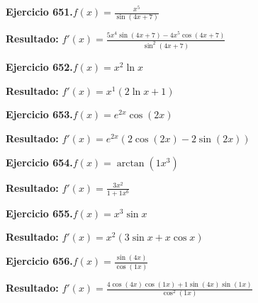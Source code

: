 \documentclass[10pt,a4paper]{article}
\begin{document}
\begin{ejbox}
\textbf{Ejercicio 651.}\quad $f(x) = \frac{x^{5}}{\sin(4x +7)}$
\end{ejbox}

\begin{solbox}
\textbf{Resultado:} \(\displaystyle f'(x) = \frac{5x^{4}\sin(4x +7) - 4x^{5}\cos(4x +7)}{\sin^2(4x +7)}\)
\end{solbox}

\newpage
\begin{ejbox}
\textbf{Ejercicio 652.}\quad $f(x) = x^{2} \ln x$
\end{ejbox}

\begin{solbox}
\textbf{Resultado:} \(\displaystyle f'(x) = x^{1}(2\ln x + 1)\)
\end{solbox}

\begin{ejbox}
\textbf{Ejercicio 653.}\quad $f(x) = e^{2x} \cos(2x)$
\end{ejbox}

\begin{solbox}
\textbf{Resultado:} \(\displaystyle f'(x) = e^{2x}(2\cos(2x) - 2\sin(2x))\)
\end{solbox}

\begin{ejbox}
\textbf{Ejercicio 654.}\quad $f(x) = \arctan(1x^{3})$
\end{ejbox}

\begin{solbox}
\textbf{Resultado:} \(\displaystyle f'(x) = \frac{3x^{2}}{1+1x^{6}}\)
\end{solbox}

\newpage
\begin{ejbox}
\textbf{Ejercicio 655.}\quad $f(x) = x^{3} \sin x$
\end{ejbox}

\begin{solbox}
\textbf{Resultado:} \(\displaystyle f'(x) = x^{2}(3\sin x + x\cos x)\)
\end{solbox}

\begin{ejbox}
\textbf{Ejercicio 656.}\quad $f(x) = \frac{\sin(4x)}{\cos(1x)}$
\end{ejbox}

\begin{solbox}
\textbf{Resultado:} \(\displaystyle f'(x) = \frac{4\cos(4x)\cos(1x) + 1\sin(4x)\sin(1x)}{\cos^2(1x)}\)
\end{solbox}
\end{document}
